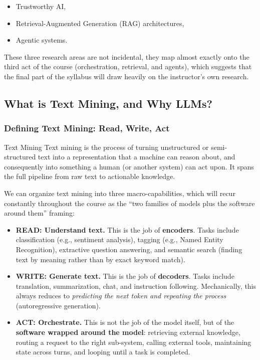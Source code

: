 \begin{itemize}
    \item Trustworthy AI,
    \item Retrieval-Augmented Generation (RAG) architectures,
    \item Agentic systems.
\end{itemize}

These three research areas are not incidental, they map almost exactly onto the third act of the course (orchestration, retrieval, and agents), which suggests that the final part of the syllabus will draw heavily on the instructor's own research.


\subsection{What is Text Mining, and Why LLMs?}

\subsubsection{Defining Text Mining: Read, Write, Act}

\begin{defbox}{Text Mining}
Text mining is the process of turning unstructured or semi-structured text into a representation that a machine can reason about, and consequently into something a human (or another system) can act upon. It spans the full pipeline from raw text to actionable knowledge.
\end{defbox}

We can organize text mining into three macro-capabilities, which will recur constantly throughout the course as the ``two families of models plus the software around them'' framing:

\begin{itemize}
    \item \textbf{READ: Understand text.} This is the job of \textbf{encoders}. Tasks include classification (e.g., sentiment analysis), tagging (e.g., Named Entity Recognition), extractive question answering, and semantic search (finding text by meaning rather than by exact keyword match).

    \vspace{0.2cm}
    \item \textbf{WRITE: Generate text.} This is the job of \textbf{decoders}. Tasks include translation, summarization, chat, and instruction following. Mechanically, this always reduces to \emph{predicting the next token and repeating the process} (autoregressive generation).

    \vspace{0.2cm}
    \item \textbf{ACT: Orchestrate.} This is not the job of the model itself, but of the \textbf{software wrapped around the model}: retrieving external knowledge, routing a request to the right sub-system, calling external tools, maintaining state across turns, and looping until a task is completed.
\end{itemize}

